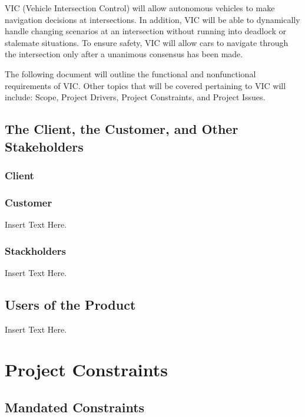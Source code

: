 \documentclass [12pt]{article}
\begin{document}
VIC (Vehicle Intersection Control) will allow autonomous vehicles to make navigation decisions at intersections. In addition, VIC will be able to dynamically handle changing scenarios at an intersection without running into deadlock or stalemate situations. To ensure safety, VIC will allow cars to navigate through the intersection only after a unanimous consensus has been made. \newline


The following document will outline the functional and nonfunctional requirements of VIC.  Other topics that will be covered pertaining to VIC will include: Scope, Project Drivers, Project Constraints, and Project Issues. \newline

\subsection{The Client, the Customer, and Other Stakeholders}

\subsubsection{Client}
\lipsum[1]  %

\subsubsection{Customer}
 Insert Text Here.

\subsubsection{Stackholders}
 Insert Text Here.

\subsection{Users of the Product} 
Insert Text Here.\\


\section{\textbf{Project Constraints}}


\subsection{Mandated Constraints}
\lipsum[1]  %
\end{document}
